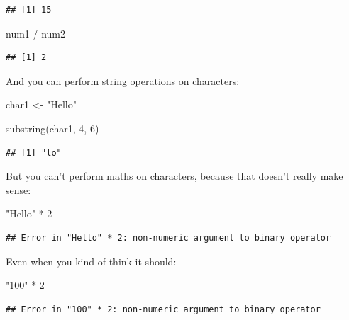 \documentclass[
]{book}
\newenvironment{Shaded}{\begin{snugshade}}{\end{snugshade}}
\newcommand{\DecValTok}[1]{\textcolor[rgb]{0.00,0.00,0.81}{#1}}
\newcommand{\FunctionTok}[1]{\textcolor[rgb]{0.00,0.00,0.00}{#1}}
\newcommand{\NormalTok}[1]{#1}
\newcommand{\OtherTok}[1]{\textcolor[rgb]{0.56,0.35,0.01}{#1}}
\newcommand{\SpecialCharTok}[1]{\textcolor[rgb]{0.00,0.00,0.00}{#1}}
\newcommand{\StringTok}[1]{\textcolor[rgb]{0.31,0.60,0.02}{#1}}
\begin{document}
\begin{verbatim}
## [1] 15
\end{verbatim}

\begin{Shaded}
\begin{Highlighting}[]
\NormalTok{num1 }\SpecialCharTok{/}\NormalTok{ num2}
\end{Highlighting}
\end{Shaded}

\begin{verbatim}
## [1] 2
\end{verbatim}

And you can perform string operations on characters:

\begin{Shaded}
\begin{Highlighting}[]
\NormalTok{char1 }\OtherTok{\textless{}{-}} \StringTok{"Hello"}

\FunctionTok{substring}\NormalTok{(char1, }\DecValTok{4}\NormalTok{, }\DecValTok{6}\NormalTok{)}
\end{Highlighting}
\end{Shaded}

\begin{verbatim}
## [1] "lo"
\end{verbatim}

But you can't perform maths on characters, because that doesn't really make sense:

\begin{Shaded}
\begin{Highlighting}[]
\StringTok{"Hello"} \SpecialCharTok{*} \DecValTok{2} 
\end{Highlighting}
\end{Shaded}

\begin{verbatim}
## Error in "Hello" * 2: non-numeric argument to binary operator
\end{verbatim}

Even when you kind of think it should:

\begin{Shaded}
\begin{Highlighting}[]
\StringTok{"100"} \SpecialCharTok{*} \DecValTok{2}
\end{Highlighting}
\end{Shaded}

\begin{verbatim}
## Error in "100" * 2: non-numeric argument to binary operator
\end{verbatim}
\end{document}
